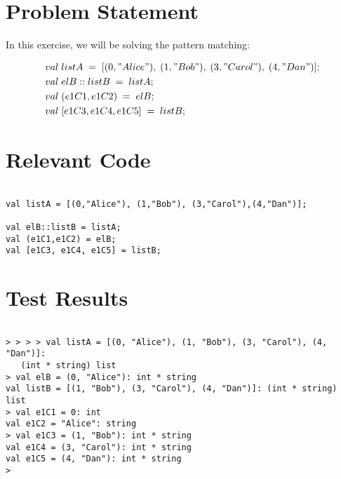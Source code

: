 \documentclass{report}
\begin{document}
\section{Problem Statement}
\label{sec:problem-statement-1}

In this exercise, we will be solving the pattern matching:

\begin{align*}
&val\; listA\; =\; [(0,"Alice"),\; (1,"Bob"),\; (3,"Carol"),\; (4,"Dan")];\\
&val\; elB::listB\; =\; listA;\\
&val\; (e1C1,e1C2)\; =\; elB;\\
&val\; [e1C3,e1C4,e1C5]\; =\; listB;\\
\end{align*}

\section{Relevant Code}
\label{sec:relevant-code-1}

\lstset{frameround=tttt}
\begin{lstlisting}[frame=tRBL]

val listA = [(0,"Alice"), (1,"Bob"), (3,"Carol"),(4,"Dan")];

val elB::listB = listA;
val (e1C1,e1C2) = elB;
val [e1C3, e1C4, e1C5] = listB;
\end{lstlisting}

\section{Test Results}
\label{sec:test-results-1}

\setcounter{sessioncount}{0}
\begin{session}
  \begin{scriptsize}
\begin{verbatim}

> > > > val listA = [(0, "Alice"), (1, "Bob"), (3, "Carol"), (4, "Dan")]:
   (int * string) list
> val elB = (0, "Alice"): int * string
val listB = [(1, "Bob"), (3, "Carol"), (4, "Dan")]: (int * string) list
> val e1C1 = 0: int
val e1C2 = "Alice": string
> val e1C3 = (1, "Bob"): int * string
val e1C4 = (3, "Carol"): int * string
val e1C5 = (4, "Dan"): int * string
> 
 
\end{verbatim}
  \end{scriptsize}
\end{session}
\end{document}
